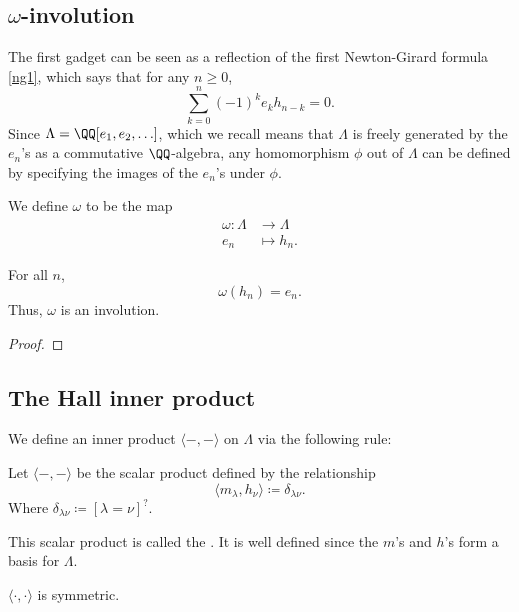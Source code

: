 \documentclass{article}
\newcommand{\pring}[2]{#1 [ {#2} ]}
\begin{document}
\subsection{\texorpdfstring{$\omega$}{w}-involution}

The first gadget can be seen as a reflection of the first Newton-Girard formula \ref{ng1}, which says that for any $n \geq 0$,
\[
    \sum_{k=0}^n (-1)^k e_k h_{n-k} = 0.
\]
Since $\Lambda = \pring{\QQ}{e_1,e_2,\ldots}$, which we recall means that $\Lambda$ is freely generated by the $e_n$'s as a commutative $\QQ$-algebra, any homomorphism $\phi$ out of $\Lambda$ can be defined by specifying the images of the $e_n$'s under $\phi$.

\begin{definition}
    We define $\omega$ to be the map
    \begin{align*}
        \omega: \Lambda &\to \Lambda \\
        e_n &\mapsto h_n.
    \end{align*}
\end{definition}

\begin{theorem}
    For all $n$,
    \[
        \omega(h_n) = e_n.
    \]
    Thus, $\omega$ is an involution.
\end{theorem}

\begin{proof}
\end{proof}

\subsection{The Hall inner product}

We define an inner product $\langle -, - \rangle$ on $\Lambda$ via the following rule:

\begin{definition} Let $\langle -,- \rangle$ be the scalar product defined by the relationship
    \[
        \langle m_\lambda, h_\nu \rangle 
        \coloneq 
        \delta_{\lambda\nu}.
    \]
    Where $\delta_{\lambda\nu} \coloneq [\lambda = \nu]^?$.

    This scalar product is called the .
    It is well defined since the $m$'s and $h$'s form a basis for $\Lambda$.
\end{definition}

\begin{theorem}
    $\langle\cdot,\cdot\rangle$ is symmetric.
\end{theorem}
\end{document}
